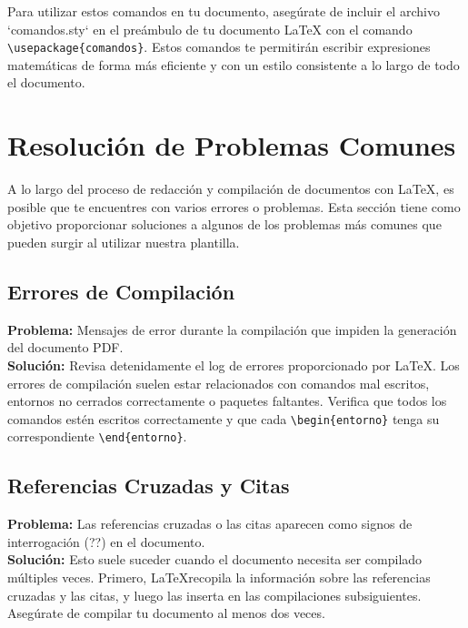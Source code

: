 \documentclass[11pt]{article}
\begin{document}
Para utilizar estos comandos en tu documento, asegúrate de incluir el archivo `comandos.sty` en el preámbulo de tu documento LaTeX con el comando \texttt{\textbackslash usepackage\{comandos\}}. Estos comandos te permitirán escribir expresiones matemáticas de forma más eficiente y con un estilo consistente a lo largo de todo el documento.




\section{Resolución de Problemas Comunes}

A lo largo del proceso de redacción y compilación de documentos con \LaTeX, es posible que te encuentres con varios errores o problemas. Esta sección tiene como objetivo proporcionar soluciones a algunos de los problemas más comunes que pueden surgir al utilizar nuestra plantilla.

\subsection{Errores de Compilación}

\textbf{Problema:} Mensajes de error durante la compilación que impiden la generación del documento PDF.\\

\textbf{Solución:} Revisa detenidamente el log de errores proporcionado por \LaTeX. Los errores de compilación suelen estar relacionados con comandos mal escritos, entornos no cerrados correctamente o paquetes faltantes. Verifica que todos los comandos estén escritos correctamente y que cada \texttt{\textbackslash begin\{entorno\}} tenga su correspondiente \texttt{\textbackslash end\{entorno\}}.

\subsection{Referencias Cruzadas y Citas}

\textbf{Problema:} Las referencias cruzadas o las citas aparecen como signos de interrogación (??) en el documento.\\

\textbf{Solución:} Esto suele suceder cuando el documento necesita ser compilado múltiples veces. Primero, \LaTeX recopila la información sobre las referencias cruzadas y las citas, y luego las inserta en las compilaciones subsiguientes. Asegúrate de compilar tu documento al menos dos veces.
\end{document}
